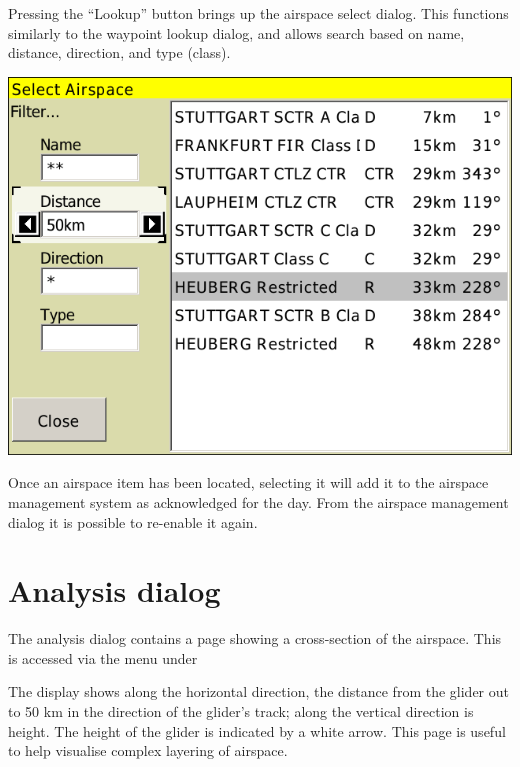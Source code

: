 \documentclass[a4paper,12pt]{refrep}
\begin{document}
Pressing the ``Lookup'' button brings up the airspace select dialog.
This functions similarly to the waypoint lookup dialog, and allows
search based on name, distance, direction, and type (class).  

\begin{center}
\includegraphics[angle=0,width=\linewidth,keepaspectratio='true']{figures/airspacelookup.png}
\end{center}

Once an airspace item has been located, selecting it will add it to
the airspace management system as acknowledged for the day.  From the
airspace management dialog it is possible to re-enable it again.

\section{Analysis dialog}

The analysis dialog contains a page showing a cross-section of the
airspace.  This is accessed via the menu under
\begin{quote}
\blink{}
\end{quote}

The display shows along the horizontal direction, the
distance from the glider out to 50 km in the direction of the glider's
track; along the vertical direction is height.  The height of the
glider is indicated by a white arrow.  This page is useful to help
visualise complex layering of airspace.
\end{document}
